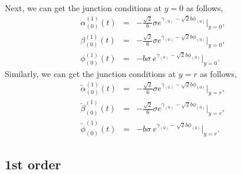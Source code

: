 \documentclass[a4paper,11pt]{article}
\begin{document}
Next, we can get the junction conditions at $y=0$ as follows,
\begin{eqnarray}
\alpha_{(0)}^{(1)}(t) &=& -\frac{\sqrt{2}}{6}\sigma
e^{\gamma_{(0)}-\sqrt{2}b\phi_{(0)}}|_{y=0}, \\
\beta_{(0)}^{(1)}(t) &=& -\frac{\sqrt{2}}{6}\sigma
e^{\gamma_{(0)}-\sqrt{2}b\phi_{(0)}}|_{y=0}, \\
\phi_{(0)}^{(1)}(t) &=& 
-b\sigma \ e^{\gamma_{(0)}-\sqrt{2}b\phi_{(0)}}|_{y=0}.
\end{eqnarray}
Similarly, we can get the junction conditions at $y=r$ as follows,
\begin{eqnarray}
\tilde{\alpha}_{(0)}^{(1)}(t) &=& -\frac{\sqrt{2}}{6}\sigma
e^{\gamma_{(0)}-\sqrt{2}b\phi_{(0)}}|_{y=r}, \\
\tilde{\beta}_{(0)}^{(1)}(t) &=& -\frac{\sqrt{2}}{6}\sigma
e^{\gamma_{(0)}-\sqrt{2}b\phi_{(0)}}|_{y=r}, \\
\tilde{\phi}_{(0)}^{(1)}(t) &=& 
-b\sigma \ e^{\gamma_{(0)}-\sqrt{2}b\phi_{(0)}}|_{y=r}.
\end{eqnarray}

\subsection{1st order}
\end{document}
